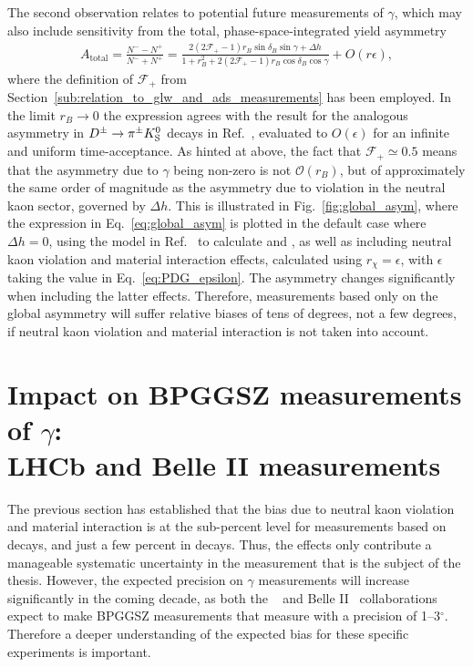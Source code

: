 The second observation relates to potential future measurements of $\gamma$, which may also include sensitivity from the total, phase-space-integrated yield asymmetry
\begin{align}\label{eq:global_asym}
    A_\text{total}=\frac{N^--N^+}{N^-+N^+} = 
    \frac{ 2(2\mathcal F_+ -1)r_B \sin \delta_B \sin \gamma +\Delta h}
    {1 + r_B^2+ 2(2\mathcal F_+ -1) r_B \cos \delta_B \cos \gamma} + O(r\epsilon),
\end{align}
where the definition of $\mathcal F_+$ from Section~\ref{sub:relation_to_glw_and_ads_measurements} has been employed. In the limit $r_B\to 0$ the expression agrees with the result for the analogous asymmetry in ${{D}^\pm}\rightarrow{\ensuremath{{\pi}^\pm}}{\ensuremath{{K}^0_{\mathrm{S}}}}$ decays in Ref.~\cite{grossmanCPViolationKSv2012}, evaluated to $O(\epsilon)$ for an infinite and uniform time-acceptance. As hinted at above, the fact that $\mathcal F_+\simeq 0.5$ means that the asymmetry due to $\gamma$ being non-zero is not $\mathcal O(r_B)$, but of approximately the same order of magnitude as the asymmetry due to \CP violation in the neutral kaon sector, governed by $\Delta h$. This is illustrated in Fig.~\ref{fig:global_asym}, where the expression in Eq.~\eqref{eq:global_asym} is plotted in the default case where $\Delta h=0$, using the model in Ref.~\cite{Belle2018} to calculate \Ki and \ci, as well as including neutral kaon \CP violation and material interaction effects, calculated using $r_\chi=\epsilon$, with $\epsilon$ taking the value in Eq.~\eqref{eq:PDG_epsilon}. The asymmetry changes significantly when including the latter effects. Therefore, measurements based only on the global asymmetry will suffer relative biases of tens of degrees, not a few degrees, if neutral kaon \CP violation and material interaction is not taken into account. 




\section{\texorpdfstring{Impact on BPGGSZ measurements of $\gamma$:\\LHCb and Belle II measurements}{Impact on BPGGSZ measurements of gamma: LHCb and Belle II measurements}} %
\label{sec:impact_on_ggsz_measurements}

The previous section has established that the bias due to neutral kaon \CP violation and material interaction is at the sub-percent level for measurements based on \BtoDK decays, and just a few percent in \BtoDpi decays. Thus, the effects only contribute a manageable systematic uncertainty in the measurement that is the subject of the thesis. However, the expected precision on $\gamma$ measurements will increase significantly in the coming decade, as both the \lhcb~\cite{lhcbcollaborationPhysicsCaseLHCb2019a} and Belle II~\cite{kouBelleIIPhysics2019a} collaborations expect to make BPGGSZ measurements that measure \g with a precision of 1--3$^\circ$. Therefore a deeper understanding of the expected bias for these specific experiments is important.


